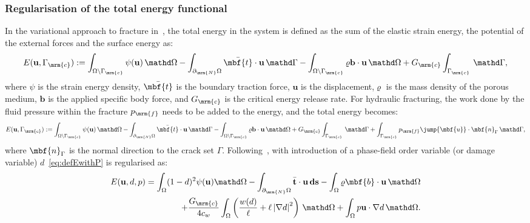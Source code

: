 \subsubsection*{Regularisation of the total energy functional}
In the variational approach to fracture in~\cite{Francfort1998}, the total energy in the system is defined as the sum of the elastic strain energy, the potential of the external forces and the surface energy as:
\begin{equation}
\label{eq:defE}
E(\mathbf{u},\Gamma_\mrm{c}) := \int_{\Omega\setminus \Gamma_\mrm{c}} \psi (\mathbf{u}) \, \mathd \Omega -\int _{\partial_{\mrm{N}} \Omega} \bar{\mbf{t}}\cdot \mathbf{u} \, \mathd \Gamma - \int_{\Omega\setminus \Gamma_\mrm{c}} \varrho \mathbf{b}\cdot \mathbf{u} \, \mathd \Omega + G_\mrm{c} \int_{\Gamma_\mrm{c}} \, \mathd \Gamma,
\end{equation}
where $\psi$ is the strain energy density, $\bar{\mbf{t}}$ is the boundary traction force, $\mathbf{u}$ is the displacement,$\varrho$ is the mass density of the porous
medium, $\mathbf{b}$ is the applied specific body force, and $G_\mrm{c}$ is the critical energy release rate. 
For hydraulic fracturing, the work done by the fluid pressure within the fracture $p_\mrm{f}$ needs to be added to the energy, and the total energy becomes:
\begin{equation}
\label{eq:defEwithP}
E(\mathbf{u},\Gamma_\mrm{c}) := \int_{\Omega\setminus \Gamma_\mrm{c}} \psi 
(\mathbf{u}) \, \mathd \Omega 
-\int _{\partial_{\mrm{N}} \Omega} \bar{\mbf{t}}\cdot \mathbf{u} \, \mathd \Gamma
- \int_{\Omega\setminus \Gamma_\mrm{c}} \varrho \mathbf{b}\cdot \mathbf{u} \, \mathd \Omega 
+ G_\mrm{c} \int_{\Gamma_\mrm{c}} \, \mathd \Gamma \\
+ \int_{\Gamma_\mrm{c}} p_\mrm{f} \jump{\mbf{u}} \cdot \mbf{n}_\Gamma \, \mathd \Gamma,
\end{equation}
where $\mbf{n}_\Gamma$ is the normal direction to the crack set $\Gamma$. 
Following~\cite{Bourdin2012}, with introduction of a phase-field order variable (or damage variable) $d$~\eqref{eq:defEwithP} is regularised as:
\begin{equation}
\label{eq:regEwithregP}
\begin{split}
E(\mathbf{u},d,p) =   \int_{\Omega} (1-d)^{2} \psi(\mathbf{u}) \mathd \Omega -\int _{\partial_{\mrm{N}} \Omega} \bar{\mathbf{t}}\cdot \mathbf{u} \, \textbf{ds} - \int_\Omega \varrho \mbf{b}\cdot \mathbf{u} \, \mathd \Omega \\
+ \frac{G_\mrm{c}}{4c_w} \int_\Omega \left( \frac{w(d)}{\ell} + \ell \left| \nabla d \right|^{2} \right) \, \mathd \Omega + \int_\Omega p \mathbf{u} \cdot \nabla d \, \mathd \Omega. 
\end{split}
\end{equation}
